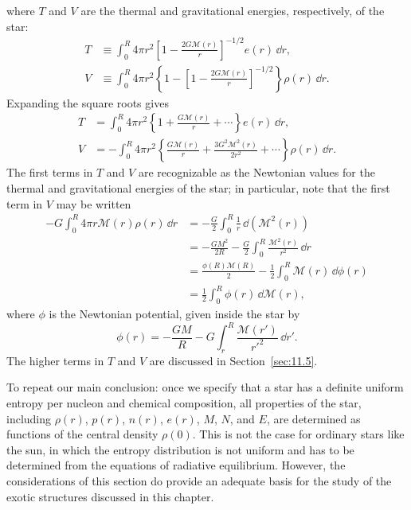 where \(T\) and \(V\) are the thermal and gravitational energies,
respectively, of the star:
\begin{align}
  T
  &\equiv
  \int_0^R4\pi r^2
  \left[1-\frac{2G\mathcal{M}(r)}r\right]^{-1/2}
  e(r)\,\dd r,
  \tag{11.1.27}\label{eq:11.1.27}\\
  V
  &\equiv
  \int_0^R4\pi r^2
  \left\{
    1-\left[1-\frac{2G\mathcal{M}(r)}r\right]^{-1/2}
  \right\}
  \rho(r)\,\dd r.
  \tag{11.1.28}\label{eq:11.1.28}
\end{align}
Expanding the square roots gives
\begin{align}
  T
  &=
  \int_0^R4\pi r^2
  \left\{1+\frac{G\mathcal{M}(r)}r+\cdots\right\}
  e(r)\,\dd r,
  \tag{11.1.29}\label{eq:11.1.29}\\
  V
  &=
  -\int_0^R4\pi r^2
  \left\{
    \frac{G\mathcal{M}(r)}r
    +\frac{3G^2\mathcal{M}^2(r)}{2r^2}
    +\cdots
  \right\}\rho(r)\,\dd r.
  \tag{11.1.30}\label{eq:11.1.30}
\end{align}
The first terms in \(T\) and \(V\) are recognizable as the Newtonian values
for the thermal and gravitational energies of the star; in particular, note
that the first term in \(V\) may be written
\begin{equation}
  \begin{aligned}
  -G\int_0^R4\pi r\mathcal{M}(r)\rho(r)\,\dd r
  &=-\frac G2\int_0^R\frac1r\,\dd\!\left(\mathcal{M}^2(r)\right)\\
  &=-\frac{GM^2}{2R}
    -\frac G2\int_0^R\frac{\mathcal{M}^2(r)}{r^2}\,\dd r\\
  &=\frac{\phi(R)\mathcal{M}(R)}2
    -\frac12\int_0^R\mathcal{M}(r)\,\dd\phi(r)\\
  &=\frac12\int_0^R\phi(r)\,\dd\mathcal{M}(r),
  \end{aligned}
  \tag{11.1.31}\label{eq:11.1.31}
\end{equation}
where \(\phi\) is the Newtonian potential, given inside the star by
\[
  \phi(r)=-\frac{GM}{R}
  -G\int_r^R\frac{\mathcal{M}(r')}{r'^2}\,\dd r'.
\]
The higher terms in \(T\) and \(V\) are discussed in
Section~\ref{sec:11.5}.

To repeat our main conclusion: once we specify that a star has a definite
uniform entropy per nucleon and chemical composition, all properties of the
star, including \(\rho(r)\), \(p(r)\), \(n(r)\), \(e(r)\), \(M\), \(N\), and
\(E\), are determined as functions of the central density \(\rho(0)\). This is
not the case for ordinary stars like the sun, in which the entropy distribution
is not uniform and has to be determined from the equations of radiative
equilibrium. However, the considerations of this section do provide an
adequate basis for the study of the exotic structures discussed in this
chapter.
